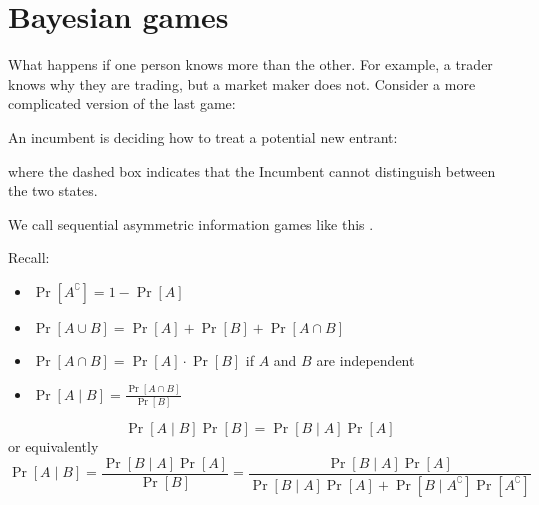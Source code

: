 \documentclass[class=bu430,notes,tikz]{agony}
\begin{document}
\section{Bayesian games}

What happens if one person knows more than the other.
For example, a trader knows why they are trading, but a market maker does not.
Consider a more complicated version of the last game:
\begin{game}\label{g:ne}
  An incumbent is deciding how to treat a potential new entrant:
  \begin{center}
  \end{center}
  where the dashed box indicates that the Incumbent cannot distinguish
  between the two states.
\end{game}
We call sequential asymmetric information games like this .

\begin{prop}
  Recall:
  \begin{itemize}
    \item $\Pr[A^\complement] = 1-\Pr[A]$
    \item $\Pr[A \cup B] = \Pr[A] + \Pr[B] + \Pr[A \cap B]$
    \item $\Pr[A \cap B] = \Pr[A] \cdot \Pr[B]$ if $A$ and $B$ are independent
    \item $\Pr[A \mid B] = \frac{\Pr[A \cap B]}{\Pr[B]}$
  \end{itemize}
\end{prop}
\begin{theorem}\label{thm:bayes}
  \[ \Pr[A \mid B] \Pr[B] = \Pr[B \mid A] \Pr[A] \]
  or equivalently
  \[ \Pr[A \mid B] = \frac{\Pr[B \mid A]\Pr[A]}{\Pr[B]} = \frac{\Pr[B \mid A]\Pr[A]}{\Pr[B \mid A]\Pr[A] + \Pr[B\mid A^\complement]\Pr[A^\complement]} \]
\end{theorem}
\end{document}
